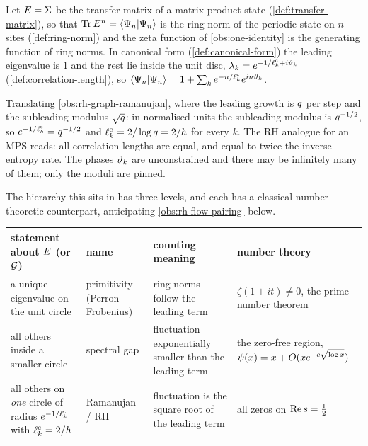 Let $E = \Sigma$ be the transfer matrix of a matrix product state
(\cref{def:transfer-matrix}), so that $\operatorname{Tr}E^{n} = \langle\Psi_{n}|\Psi_{n}\rangle$ is the ring norm
of the periodic state on $n$ sites (\cref{def:ring-norm}) and the zeta function of
\cref{obs:one-identity} is the generating function of ring norms. In canonical form
(\cref{def:canonical-form}) the leading eigenvalue is $1$ and the rest lie inside the
unit disc, $\lambda_k = e^{-1/\ell^{\mathrm{c}}_{k}+i\vartheta_{k}}$
(\cref{def:correlation-length}), so $\langle\Psi_{n}|\Psi_{n}\rangle = 1 + \sum_k
e^{-n/\ell^{\mathrm{c}}_{k}}e^{in\vartheta_{k}}$.

\begin{observation}
\label{obs:rh-mps-correlation-length}
Translating \cref{obs:rh-graph-ramanujan}, where the leading growth is $q$ per step
and the subleading modulus $\sqrt{q}$: in normalised units the subleading modulus is
$q^{-1/2}$, so $e^{-1/\ell^{\mathrm{c}}_{k}} = q^{-1/2}$ and $\ell^{\mathrm{c}}_{k} = 2/\log q =
2/h$ for every $k$. The RH analogue for an MPS reads: all correlation lengths are
equal, and equal to twice the inverse entropy rate. The phases $\vartheta_{k}$ are
unconstrained and there may be infinitely many of them; only the moduli are pinned.
\end{observation}

The hierarchy this sits in has three levels, and each has a classical number-theoretic
counterpart, anticipating \cref{obs:rh-flow-pairing} below.

\begin{center}
\begin{tabular}{@{}p{3.1cm}p{2.5cm}p{4.0cm}p{4.7cm}@{}}
\toprule
statement about $E$ (or $\mathcal G$) & name & counting meaning & number theory \\
\midrule
a unique eigenvalue on the unit circle &
primitivity (Perron--Frobenius) &
ring norms follow the leading term &
$\zeta(1+it)\ne0$, the prime number theorem \\
all others inside a smaller circle &
spectral gap &
fluctuation exponentially smaller than the leading term &
the zero-free region, $\psi(x) = x + O(x e^{-c\sqrt{\log x}})$ \\
all others on \emph{one} circle of radius $e^{-1/\ell^{\mathrm{c}}_{k}}$ with
$\ell^{\mathrm{c}}_{k} = 2/h$ &
Ramanujan / RH &
fluctuation is the square root of the leading term &
all zeros on $\operatorname{Re} s = \tfrac12$ \\
\bottomrule
\end{tabular}
\end{center}


